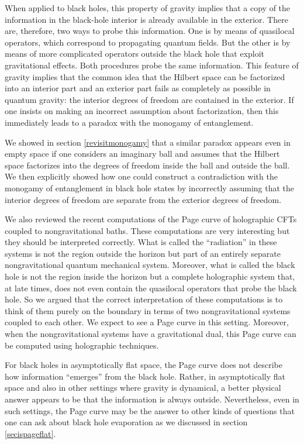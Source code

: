 \documentclass[12pt]{article}
\begin{document}
When applied to black holes, this property of gravity implies that a copy
of the information in the black-hole interior is already available in the exterior. There are, therefore, two ways to probe this information. One is by means of quasilocal operators, which correspond to propagating quantum fields.
But the other is by means of more complicated operators outside the black hole that exploit gravitational effects. Both procedures probe the same information. This feature of gravity implies that the common idea that the Hilbert space can be factorized into an interior part and an exterior part  fails as completely as possible in quantum gravity: the interior degrees of freedom are contained in the exterior.  If one insists on making an incorrect assumption about factorization,  then this immediately leads to a paradox with the monogamy of entanglement.

We showed in section \ref{revisitmonogamy} that a similar paradox appears even in empty space if one considers an imaginary ball  and assumes that the Hilbert space factorizes into the degrees of freedom inside the ball and outside the ball. We then explicitly showed how one could construct a contradiction
with the monogamy of entanglement in black hole states by incorrectly assuming
that the interior degrees of freedom are separate from the exterior degrees of freedom.

We also reviewed the recent computations of the Page curve of holographic
CFTs coupled to nongravitational baths. These computations are very interesting but they should be interpreted correctly.  What is called the
``radiation'' in these systems is not the region outside the horizon but
 part of an entirely separate nongravitational quantum mechanical system. Moreover, what is called the
black hole is not the region inside the horizon but a complete holographic system that, at late times, does not even contain the quasilocal operators that probe the black hole. So we argued that the correct interpretation of these
computations is to think of them purely on the boundary in terms of two nongravitational systems coupled to each other. We expect to see a Page curve in this setting. Moreover, when the nongravitational systems have
a gravitational dual, this Page curve can be computed using holographic techniques.

For black holes in asymptotically flat space, the Page curve does not describe how information ``emerges'' from the black hole.  Rather,  in asymptotically flat space and also in other settings where gravity is dynamical, a better
physical answer appears to be that the information is always outside. Nevertheless, even in such settings, the Page curve may be the answer to other kinds of questions that one can ask about black hole evaporation as we discussed in section \ref{secispageflat}.
\end{document}
